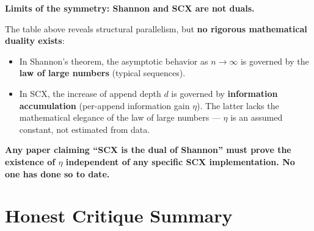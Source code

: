 \documentclass[12pt,a4paper]{article}
\theoremstyle{plain}
\theoremstyle{definition}
\begin{document}
\begin{honestbox}
\textbf{Limits of the symmetry: Shannon and SCX are not duals.}

The table above reveals structural parallelism, but \textbf{no rigorous mathematical duality exists}:
\begin{itemize}
    \item In Shannon's theorem, the asymptotic behavior as $n \to \infty$ is governed by the \textbf{law of large numbers} (typical sequences).
    \item In SCX, the increase of append depth $d$ is governed by \textbf{information accumulation} (per-append information gain $\eta$).
    The latter lacks the mathematical elegance of the law of large numbers --- $\eta$ is an assumed constant, not estimated from data.
\end{itemize}

\textbf{Any paper claiming ``SCX is the dual of Shannon'' must prove the existence of $\eta$ independent of any specific SCX implementation. No one has done so to date.}
\end{honestbox}

\section{Honest Critique Summary}
\label{sec:conclusion}
\end{document}
